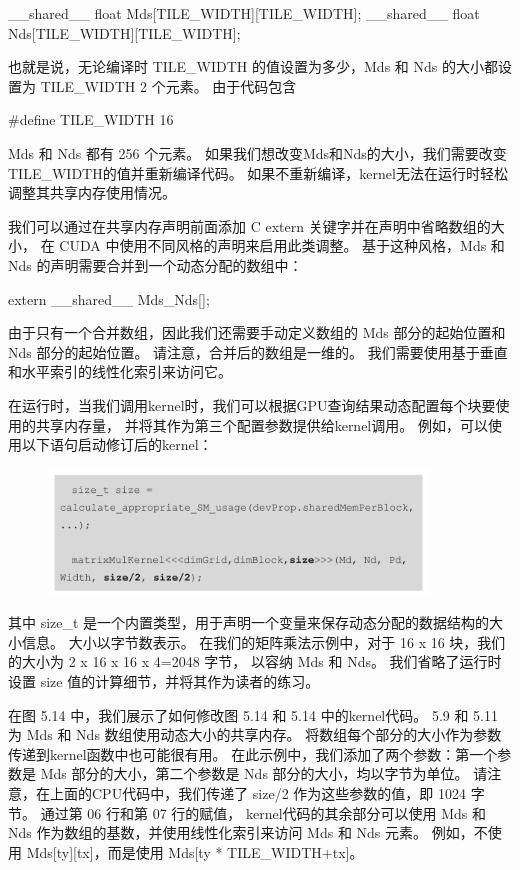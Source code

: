 \_\_shared\_\_ float Mds[TILE\_WIDTH][TILE\_WIDTH];
\_\_shared\_\_ float Nds[TILE\_WIDTH][TILE\_WIDTH];

也就是说，无论编译时 TILE\_WIDTH 的值设置为多少，Mds 和 Nds 的大小都设置为 TILE\_WIDTH 2 个元素。 由于代码包含

\#define TILE\_WIDTH 16

Mds 和 Nds 都有 256 个元素。 如果我们想改变Mds和Nds的大小，我们需要改变TILE\_WIDTH的值并重新编译代码。 
如果不重新编译，kernel无法在运行时轻松调整其共享内存使用情况。

我们可以通过在共享内存声明前面添加 C extern 关键字并在声明中省略数组的大小，
在 CUDA 中使用不同风格的声明来启用此类调整。 基于这种风格，Mds 和 Nds 的声明需要合并到一个动态分配的数组中：

extern \_\_shared\_\_ Mds\_Nds[];

由于只有一个合并数组，因此我们还需要手动定义数组的 Mds 部分的起始位置和 Nds 部分的起始位置。 
请注意，合并后的数组是一维的。 我们需要使用基于垂直和水平索引的线性化索引来访问它。

在运行时，当我们调用kernel时，我们可以根据GPU查询结果动态配置每个块要使用的共享内存量，
并将其作为第三个配置参数提供给kernel调用。 例如，可以使用以下语句启动修订后的kernel：

\begin{figure}[H]
	\centering
	\includegraphics[width=0.9\textwidth]{figs/F5-a.2.png}
\end{figure}

其中 size\_t 是一个内置类型，用于声明一个变量来保存动态分配的数据结构的大小信息。 
大小以字节数表示。 在我们的矩阵乘法示例中，对于 16 x 16 块，我们的大小为 2 x 16 x 16 x 4=2048 字节，
以容纳 Mds 和 Nds。 我们省略了运行时设置 size 值的计算细节，并将其作为读者的练习。

在图 5.14 中，我们展示了如何修改图 5.14 和 5.14 中的kernel代码。 
5.9 和 5.11 为 Mds 和 Nds 数组使用动态大小的共享内存。 将数组每个部分的大小作为参数传递到kernel函数中也可能很有用。 
在此示例中，我们添加了两个参数：第一个参数是 Mds 部分的大小，第二个参数是 Nds 部分的大小，均以字节为单位。 
请注意，在上面的CPU代码中，我们传递了 size/2 作为这些参数的值，即 1024 字节。 通过第 06 行和第 07 行的赋值，
kernel代码的其余部分可以使用 Mds 和 Nds 作为数组的基数，并使用线性化索引来访问 Mds 和 Nds 元素。 
例如，不使用 Mds[ty][tx]，而是使用 Mds[ty * TILE\_WIDTH+tx]。


